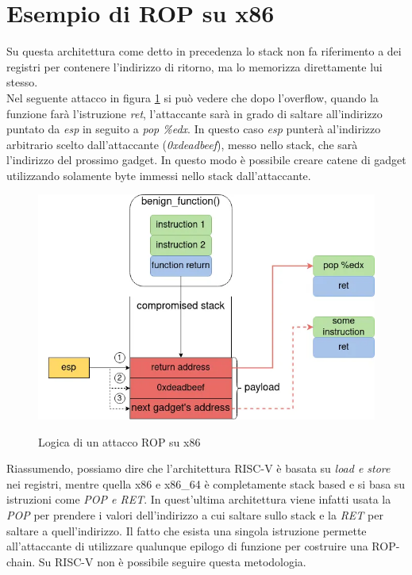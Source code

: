 \section*{Esempio di ROP su x86}
Su questa architettura come detto in precedenza lo stack non fa riferimento a dei registri per contenere l'indirizzo di ritorno, ma lo memorizza direttamente lui stesso.\\
Nel seguente attacco in figura \ref{ref:x86-rop} si può vedere che dopo l'overflow, quando la funzione farà l'istruzione \textit{ret}, l'attaccante sarà in grado di saltare all'indirizzo puntato da \textit{esp} in seguito a \textit{pop \%edx}. In questo caso \textit{esp} punterà al'indirizzo arbitrario scelto dall'attaccante (\textit{0xdeadbeef}), messo nello stack, che sarà l'indirizzo del prossimo gadget. In questo modo è possibile creare catene di gadget utilizzando solamente byte immessi nello stack dall'attaccante.
\vspace{1cm}
\FloatBarrier
\begin{figure}[!htbp]
    \centering
    \includegraphics[width=0.7\linewidth]{images/x86-rop.png}
    \caption{Logica di un attacco ROP su x86} \cite{infosecwriteupsROP}
    \label{ref:x86-rop}
\end{figure}
\FloatBarrier
\vspace{1cm}
Riassumendo, possiamo dire che l'architettura RISC-V è basata su \textit{load e store} nei registri, mentre quella x86 e x86\_64 è completamente stack based e si basa su istruzioni come \textit{POP e RET}. In quest'ultima architettura viene infatti usata la \textit{POP} per prendere i valori dell'indirizzo a cui saltare sullo stack e la \textit{RET} per saltare a quell'indirizzo. Il fatto che esista una singola istruzione permette all'attaccante di utilizzare qualunque epilogo di funzione per costruire una ROP-chain. Su RISC-V non è possibile seguire questa metodologia.\\
